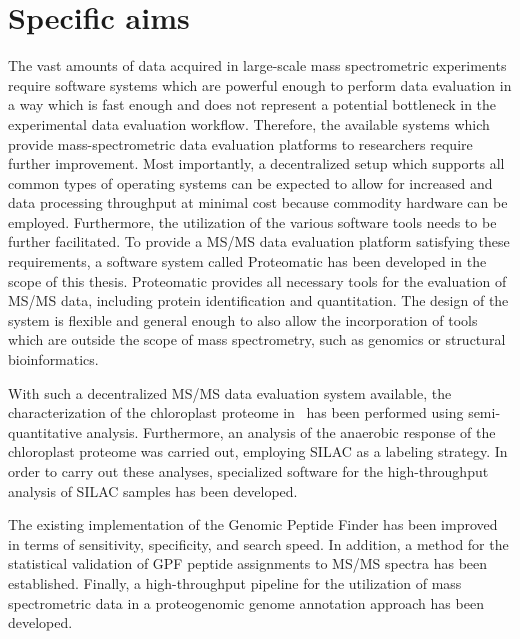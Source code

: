 \cleardoublepage
\chapter{Specific aims}

The vast amounts of data acquired in large-scale mass spectrometric experiments
require software systems which are powerful enough to perform data evaluation
in a way which is fast enough and does not represent a potential bottleneck in 
the experimental data evaluation workflow.
Therefore, the available systems which provide mass-spectrometric data 
evaluation platforms to researchers require further improvement.
Most importantly, a decentralized setup which supports all common types of 
operating systems can be expected to allow for increased and data processing 
throughput at minimal cost because commodity hardware can be employed.
Furthermore, the utilization of the various software tools needs to be further 
facilitated.
To provide a MS/MS data evaluation platform satisfying these requirements,
a software system called Proteomatic has been developed in the scope of this 
thesis.
Proteomatic provides all necessary tools for the evaluation of MS/MS data, 
including protein identification and quantitation.
The design of the system is flexible and general enough to also
allow the incorporation of tools which are outside the scope of mass 
spectrometry, such as genomics or structural bioinformatics.

With such a decentralized MS/MS data evaluation system available, the
characterization of the chloroplast proteome in \cre~has been performed using
semi-quantitative analysis.
Furthermore, an analysis of the anaerobic response of the chloroplast proteome
was carried out, employing SILAC as a labeling strategy.
In order to carry out these analyses, specialized software for the 
high-throughput analysis of SILAC samples has been developed.

The existing implementation of the Genomic Peptide Finder has been
improved in terms of sensitivity, specificity, and search speed.
In addition, a method for the statistical validation of GPF peptide 
assignments to MS/MS spectra has been established.
Finally, a high-throughput pipeline for the utilization of mass spectrometric 
data in a proteogenomic genome annotation approach has been developed.
